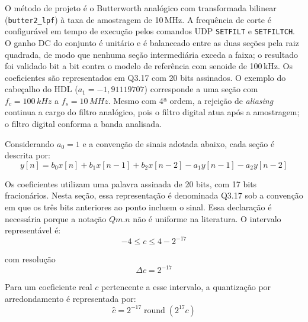 O método de projeto é o Butterworth analógico com transformada bilinear (\texttt{butter2\_lpf}) à taxa de amostragem de 10\,MHz. A frequência de corte é configurável em tempo de execução pelos comandos UDP \texttt{SETFILT} e \texttt{SETFILTCH}. O ganho DC do conjunto é unitário e é balanceado entre as duas seções pela raiz quadrada, de modo que nenhuma seção intermediária exceda a faixa; o resultado foi validado bit a bit contra o modelo de referência com senoide de 100\,kHz. Os coeficientes são representados em Q3.17 com 20 bits assinados. O exemplo do cabeçalho do HDL ($a_1 = -1,91119707$) corresponde a uma seção com $f_c = 100\,kHz$ a $f_s = 10\,MHz$. Mesmo com 4ª ordem, a rejeição de \textit{aliasing} continua a cargo do filtro analógico, pois o filtro digital atua após a amostragem; o filtro digital conforma a banda analisada.

Considerando \(a_0=1\) e a convenção de sinais adotada abaixo, cada seção é descrita por:
\begin{equation}
	y[n] = b_0x[n] + b_1x[n-1] + b_2x[n-2] - a_1y[n-1] - a_2y[n-2]
	\label{v2:eq:biquad}
\end{equation}

Os coeficientes utilizam uma palavra assinada de 20 bits, com 17 bits fracionários. Nesta seção, essa representação é denominada Q3.17 sob a convenção em que os três bits anteriores ao ponto incluem o sinal. Essa declaração é necessária porque a notação \(Qm.n\) não é uniforme na literatura. O intervalo representável é:
\begin{equation}
	-4 \leq c \leq 4-2^{-17}
	\label{v2:eq:intervalo_q317}
\end{equation}

\noindent
com resolução
\begin{equation}
	\Delta c = 2^{-17}
	\label{v2:eq:resolucao_q317}
\end{equation}

Para um coeficiente real \(c\) pertencente a esse intervalo, a quantização por arredondamento é representada por:
\begin{equation}
	\widehat{c} = 2^{-17} \operatorname{round} \left(2^{17}c\right)
	\label{v2:eq:quantizacao_coeficiente}
\end{equation}

